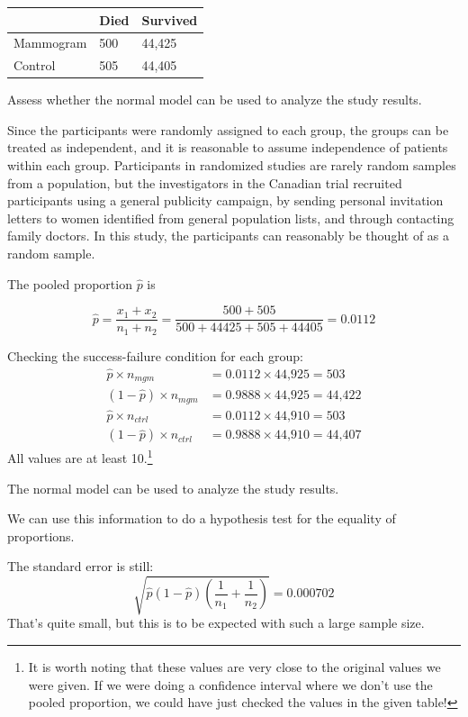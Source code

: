 \documentclass[
  letterpaper,
  DIV=11,
  numbers=noendperiod,
  oneside]{scrreprt}
\begin{document}
\begin{longtable}[]{@{}lll@{}}
\toprule\noalign{}
& Died & Survived \\
\midrule\noalign{}
\endhead
\bottomrule\noalign{}
\endlastfoot
Mammogram & 500 & 44,425 \\
Control & 505 & 44,405 \\
\end{longtable}

Assess whether the normal model can be used to analyze the study
results.

Since the participants were randomly assigned to each group, the groups
can be treated as independent, and it is reasonable to assume
independence of patients within each group. Participants in randomized
studies are rarely random samples from a population, but the
investigators in the Canadian trial recruited participants using a
general publicity campaign, by sending personal invitation letters to
women identified from general population lists, and through contacting
family doctors. In this study, the participants can reasonably be
thought of as a random sample.

The pooled proportion \(\hat{p}\) is

\[
\hat{p} = \dfrac{x_{1} + x_{2}}{n_{1} + n_{2}} = \dfrac{500 + 505}{500 + 44425 + 505 + 44405} = 0.0112
\]

Checking the success-failure condition for each group: \begin{align*}
\hat{p} \times n_{mgm} &= 0.0112 \times \text{44,925} = 503\\
(1 - \hat{p}) \times n_{mgm} &= 0.9888 \times \text{44,925} = \text{44,422} \\
\hat{p} \times n_{ctrl} &= 0.0112 \times \text{44,910} = 503\\
(1 - \hat{p}) \times n_{ctrl} &= 0.9888 \times \text{44,910} = \text{44,407}
\end{align*} All values are at least 10.\footnote{It is worth noting
  that these values are very close to the original values we were given.
  If we were doing a confidence interval where we don't use the pooled
  proportion, we could have just checked the values in the given table!}

The normal model can be used to analyze the study results.

We can use this information to do a hypothesis test for the equality of
proportions.

The standard error is still: \[
\sqrt{\hat p(1 - \hat p)\left(\frac{1}{n_1} + \frac{1}{n_2}\right)} = 0.000702
\] That's quite small, but this is to be expected with such a large
sample size.
\end{document}
